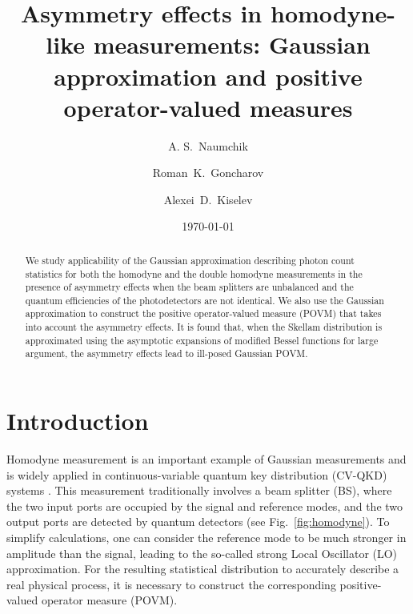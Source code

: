 \documentclass[%
reprint,
superscriptaddress,
 amsmath,amssymb,amsfonts,
 aps,
 pra,
 longbibliography
]{revtex4-2}
\begin{document}
\title{
  Asymmetry effects in homodyne-like measurements:
Gaussian approximation and positive operator-valued measures
}

\author{A. S.~Naumchik}


\author{Roman~K.~Goncharov}


\author{Alexei~D.~Kiselev}

\date{\today}

\begin{abstract}
  We study applicability of
  the Gaussian approximation describing
  photon count statistics for both the homodyne and the double homodyne
  measurements in the presence of asymmetry effects when
  the beam splitters are unbalanced and the quantum efficiencies of
  the photodetectors are not identical.
We also use the Gaussian approximation to construct
the positive operator-valued measure (POVM) that takes into account the asymmetry effects. 
It is found that, when the Skellam distribution is approximated using the asymptotic expansions of
modified Bessel functions for large argument,
the asymmetry effects lead to ill-posed Gaussian POVM.
\end{abstract}
 
 \maketitle

\section{Introduction}
\label{sec:intro}


Homodyne measurement is an important example of Gaussian measurements and is widely applied in
continuous-variable quantum key distribution (CV-QKD) systems
\cite{PhysRevLett.88.057902,PhysRevLett.93.170504,RevModPhys.84.621,e17096072,opt3040030,Zhang:apr:2024}.
This
measurement traditionally involves a beam splitter (BS), where the two input ports are occupied by
the signal and reference modes, and the two output ports are detected by quantum detectors (see
Fig.~\ref{fig:homodyne}).  To simplify calculations, one can consider the reference mode to be much
stronger in amplitude than the signal, leading to the so-called strong Local Oscillator (LO)
approximation. For the resulting statistical distribution to accurately describe a real physical
process, it is necessary to construct the corresponding positive-valued operator measure (POVM).
\end{document}
